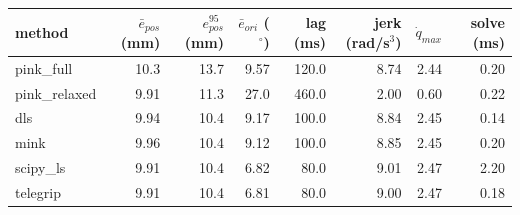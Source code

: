 \begin{tabular}{lrrrrrrr}
\toprule
method & $\bar{e}_{pos}$ (mm) & $e_{pos}^{95}$ (mm) & $\bar{e}_{ori}$ ($^\circ$) & lag (ms) & jerk (rad/s$^3$) & $\dot{q}_{max}$ & solve (ms) \\
\midrule
pink\_full & 10.3 & 13.7 & 9.57 & 120.0 & 8.74 & 2.44 & 0.20 \\
pink\_relaxed & 9.91 & 11.3 & 27.0 & 460.0 & 2.00 & 0.60 & 0.22 \\
dls & 9.94 & 10.4 & 9.17 & 100.0 & 8.84 & 2.45 & 0.14 \\
mink & 9.96 & 10.4 & 9.12 & 100.0 & 8.85 & 2.45 & 0.20 \\
scipy\_ls & 9.91 & 10.4 & 6.82 & 80.0 & 9.01 & 2.47 & 2.20 \\
telegrip & 9.91 & 10.4 & 6.81 & 80.0 & 9.00 & 2.47 & 0.18 \\
\bottomrule
\end{tabular}
